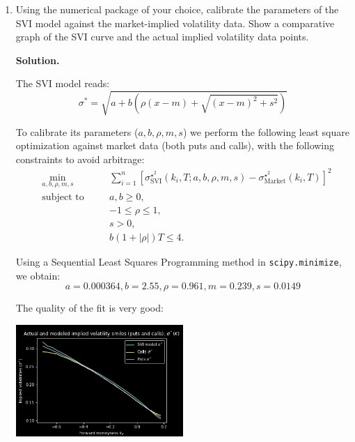 \documentclass[12pt]{article}
\newenvironment{solution}{\vspace{0.2cm} \textbf{Solution.}}{}
\begin{document}
	\begin{enumerate}[label=(\alph*)]

		\item Using the numerical package of your choice, calibrate the parameters of the SVI model against the market-implied volatility data. Show a comparative graph of the SVI curve and the actual implied volatility data points.

		\begin{solution}
		
		The SVI model reads: 
		$$ \sigma^* = \sqrt{a + b \left( \rho (x - m)  + \sqrt{(x-m)^2 + s^2} \right)} $$

		To calibrate its parameters ($a, b, \rho, m, s$) we perform the following least square optimization against market data (both puts and calls), with the following constraints to avoid arbitrage:
        \begin{subequations}
        	\begin{alignat*}{2}
        	&\!\min_{a,b,\rho,m,s}        &\quad& \sum_{i=1}^{n} \left[ \sigma_{\text{SVI}}^{\star^2}(k_i,T;a,b,\rho,m,s) - \sigma_{\text{Market}}^{\star^2}(k_i,T)\right]^2\\
        	&\text{subject to} &      & a,b \geq 0,\\
        	&                  &      & -1 \leq \rho \leq 1,\\
        	&                  &      & s > 0,\\
        	&                  &      & b(1 + |\rho|)T \leq 4.
        	\end{alignat*}
        \end{subequations}
    	
		Using a Sequential Least Squares Programming method in \texttt{scipy.minimize}, we obtain: $$a = 0.000364, b = 2.55, \rho = 0.961, m = 0.239, s = 0.0149$$
		
		The quality of the fit is very good:
		
		\begin{center}
			\includegraphics[width=0.5\textwidth]{SVI_calibrated}
		\end{center}


\end{solution}
\end{enumerate}
\end{document}
